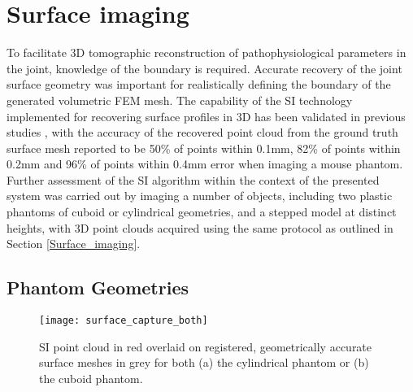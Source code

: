 \documentclass[twoside]{bhamthesis}
\theoremstyle{definition}
\begin{document}
\section{Surface imaging}

To facilitate 3D tomographic reconstruction of pathophysiological parameters in the joint, knowledge of the boundary is required. Accurate recovery of the joint surface geometry was important for realistically defining the boundary of the generated volumetric FEM mesh. The capability of the SI technology implemented for recovering surface profiles in 3D has been validated in previous studies \cite{basevi2013simultaneous,guggenheim2014multi}, with the accuracy of the recovered point cloud from the ground truth surface mesh reported to be 50\% of points within 0.1mm, 82\% of points within 0.2mm and 96\% of points within 0.4mm error when imaging a mouse phantom. Further assessment of the SI algorithm within the context of the presented system was carried out by imaging a number of objects, including two plastic phantoms of cuboid or cylindrical geometries, and a stepped model at distinct heights, with 3D point clouds acquired using the same protocol as outlined in Section \ref{Surface_imaging}.


\subsection{Phantom Geometries}
\label{phantom_SI}

\begin{figure}[!ht]
\texttt{[image: surface\_capture\_both]}
\centering
\caption{SI point cloud in red overlaid on registered, geometrically accurate surface meshes in grey for both (a) the cylindrical phantom or (b) the cuboid phantom.}
\label{surface_capture_both}
\end{figure}
\end{document}
